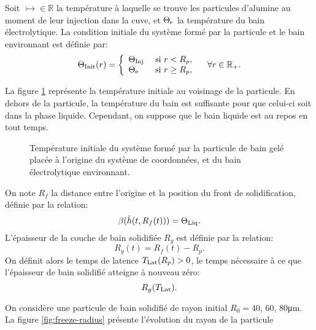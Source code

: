 Soit $\tinj\in\mathbb R$ la température à laquelle se trouve les
particules d'alumine au moment de leur injection dans la cuve, et
$\Theta_\mathrm{e}$ la température du bain électrolytique. La condition
initiale du système formé par la particule et le bain environnant est
définie par:
\begin{equation}
  \Theta_\text{Init}(r) = \left\{
  \begin{array}{ll}
    \Theta_\text{Inj} & \text{ si } r < R_p,\\
    \Theta_\mathrm{e} & \text{ si } r \geq R_p,\\
  \end{array}
  \right.\quad \forall r\in \mathbb R_+ .\label{eq:initial-temperature}
\end{equation}

La figure \ref{fig:particle-initial-temperature} représente la
température initiale au voisinage de la particule. En dehors de la
particule, la température du bain est suffisante pour que celui-ci
soit dans la phase liquide. Cependant, on suppose que le bain liquide
est au repos en tout temps.

\begin{figure}[h]
  \begin{center}
    
    \caption{Température initiale du système formé par la particule de
      bain gelé placée à l'origine du système de coordonnées, et du
      bain électrolytique environnant.}
    \label{fig:particle-initial-temperature}
  \end{center}
\end{figure}

On note $R_f$ la distance entre l'origine et la position du front de
solidification, définie par la relation:
\begin{equation}
\beta(\tilde{h}(t, R_f(t))) = \Theta_\text{Liq}.
\end{equation}
L'épaisseur de la couche de bain solidifiée $R_g$ est définie par la
relation:
\begin{equation}
R_g(t) = R_f(t) - R_p.
\end{equation}
On définit alors le temps de latence $T_\text{Lat}(R_p) > 0$, le temps
nécessaire à ce que l'épaisseur de bain solidifié atteigne à nouveau
zéro:
\begin{equation}
  R_g(T_\text{Lat}).
\end{equation}

On considère une particule de bain solidifié de rayon initial $R_0
=$\num{40}, \num{60}, \num{80}\si{\micro\meter}. La figure
\ref{fig:freeze-radius} présente l'évolution du rayon de la
particule

